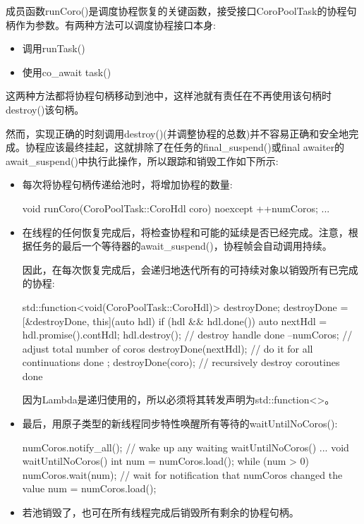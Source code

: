 成员函数runCoro()是调度协程恢复的关键函数，接受接口CoroPoolTask的协程句柄作为参数。有两种方法可以调度协程接口本身:

\begin{itemize}
\item 
调用runTask()

\item 
使用co\_await task()
\end{itemize}

这两种方法都将协程句柄移动到池中，这样池就有责任在不再使用该句柄时destroy()该句柄。

然而，实现正确的时刻调用destroy()(并调整协程的总数)并不容易正确和安全地完成。协程应该最终挂起，这就排除了在任务的final\_suspend()或final awaiter的await\_suspend()中执行此操作，所以跟踪和销毁工作如下所示:

\begin{itemize}
\item 
每次将协程句柄传递给池时，将增加协程的数量:

\begin{cpp}
void runCoro(CoroPoolTask::CoroHdl coro) noexcept {
	++numCoros;
	...
}
\end{cpp}

\item 
在线程的任何恢复完成后，将检查协程和可能的延续是否已经完成。注意，根据任务的最后一个等待器的await\_suspend()，协程帧会自动调用持续。

因此，在每次恢复完成后，会递归地迭代所有的可持续对象以销毁所有已完成的协程:

\begin{cpp}
std::function<void(CoroPoolTask::CoroHdl)> destroyDone;
destroyDone = [&destroyDone, this](auto hdl) {
					if (hdl && hdl.done()) {
						auto nextHdl = hdl.promise().contHdl;
						hdl.destroy(); // destroy handle done
						--numCoros; // adjust total number of coros
						destroyDone(nextHdl); // do it for all continuations done
					}
				};
destroyDone(coro); // recursively destroy coroutines done
\end{cpp}

因为Lambda是递归使用的，所以必须将其转发声明为std::function<>。

\item 
最后，用原子类型的新线程同步特性唤醒所有等待的waitUntilNoCoros():

\begin{cpp}
numCoros.notify_all(); // wake up any waiting waitUntilNoCoros()
...
void waitUntilNoCoros() {
	int num = numCoros.load();
	while (num > 0) {
		numCoros.wait(num); // wait for notification that numCoros changed the value
		num = numCoros.load();
	}
}
\end{cpp}

\item 
若池销毁了，也可在所有线程完成后销毁所有剩余的协程句柄。
\end{itemize}

